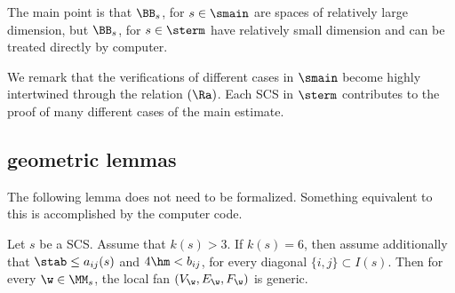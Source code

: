 The main point is that $\BB_s$, for $s\in\smain$ are spaces of relatively large
dimension, but $\BB_s$, for $s\in\sterm$ have relatively small dimension and
can be treated directly by computer.




We remark that the verifications of  different cases in $\smain$ become
highly intertwined through the relation $(\Ra)$.  Each SCS
 in $\sterm$ contributes to the proof of many different cases
of the main estimate.




\subsection{geometric lemmas}


The following lemma does not need to be formalized.  Something
equivalent
to this is accomplished by the computer code.


\begin{lemma}\label{lemma:bjo} 
Let $s$ be a SCS.
Assume that $k(s)>3$.
If $k(s)=6$, then assume additionally that
$\stab\le a_{i j}(s)$ and $4\hm < b_{i j}$, 
for every diagonal $\{i,j\}\subset I(s)$.
Then for every  $\w\in\MM_s$,  the local fan $(V_\w,E_\w,F_\w)$ is generic.
\end{lemma}

